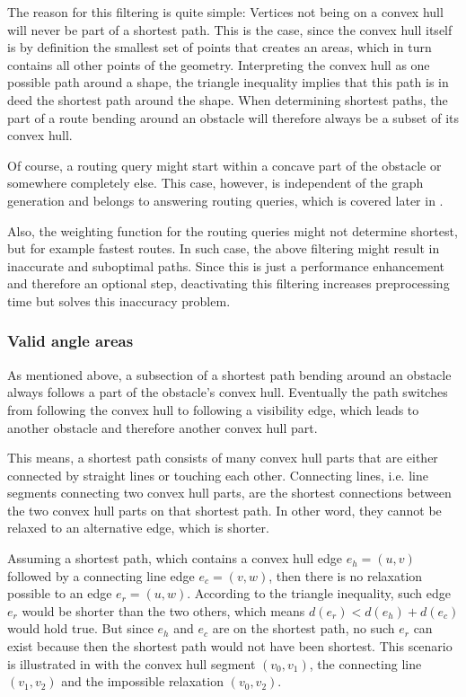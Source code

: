 			The reason for this filtering is quite simple:
			Vertices not being on a convex hull will never be part of a shortest path.
			This is the case, since the convex hull itself is by definition the smallest set of points that creates an areas, which in turn contains all other points of the geometry\cite[2]{de-berg-computational-geometry}.
			Interpreting the convex hull as one possible path around a shape, the triangle inequality implies that this path is in deed the shortest path around the shape.
			When determining shortest paths, the part of a route bending around an obstacle will therefore always be a subset of its convex hull.
			
			Of course, a routing query might start within a concave part of the obstacle or somewhere completely else.
			This case, however, is independent of the graph generation and belongs to answering routing queries, which is covered later in .
			
			Also, the weighting function for the routing queries might not determine shortest, but for example fastest routes.
			In such case, the above filtering might result in inaccurate and suboptimal paths.
			Since this is just a performance enhancement and therefore an optional step, deactivating this filtering increases preprocessing time but solves this inaccuracy problem.
						
		\subsubsection{Valid angle areas}
			
			As mentioned above, a subsection of a shortest path bending around an obstacle always follows a part of the obstacle's convex hull.
			Eventually the path switches from following the convex hull to following a visibility edge, which leads to another obstacle and therefore another convex hull part.
			
			This means, a shortest path consists of many convex hull parts that are either connected by straight lines or touching each other.
			Connecting lines, i.e. line segments connecting two convex hull parts, are the shortest connections between the two convex hull parts on that shortest path.
			In other word, they cannot be relaxed to an alternative edge, which is shorter.
			
			Assuming a shortest path, which contains a convex hull edge $e_h=(u, v)$ followed by a connecting line edge $e_c=(v, w)$, then there is no relaxation possible to an edge $e_r=(u, w)$.
			According to the triangle inequality, such edge $e_r$ would be shorter than the two others, which means $d(e_r) < d(e_h) + d(e_c)$ would hold true.
			But since $e_h$ and $e_c$ are on the shortest path, no such $e_r$ can exist because then the shortest path would not have been shortest.
			This scenario is illustrated in  with the convex hull segment $(v_0, v_1)$, the connecting line $(v_1, v_2)$ and the impossible relaxation $(v_0, v_2)$.
			
